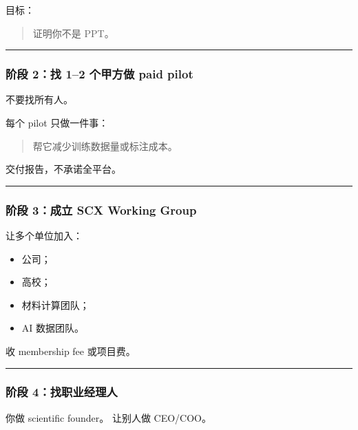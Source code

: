 \documentclass[
  12pt,
]{ctexart}
\providecommand{\tightlist}{%
  \setlength{\itemsep}{0pt}\setlength{\parskip}{0pt}}
\begin{document}
目标：

\begin{quote}
证明你不是 PPT。
\end{quote}

\begin{center}\rule{0.5\linewidth}{0.5pt}\end{center}

\subsubsection{阶段 2：找 1--2 个甲方做 paid
pilot}\label{ux9636ux6bb5-2ux627e-12-ux4e2aux7532ux65b9ux505a-paid-pilot}

不要找所有人。

每个 pilot 只做一件事：

\begin{quote}
帮它减少训练数据量或标注成本。
\end{quote}

交付报告，不承诺全平台。

\begin{center}\rule{0.5\linewidth}{0.5pt}\end{center}

\subsubsection{阶段 3：成立 SCX Working
Group}\label{ux9636ux6bb5-3ux6210ux7acb-scx-working-group}

让多个单位加入：

\begin{itemize}
\tightlist
\item
  公司；
\item
  高校；
\item
  材料计算团队；
\item
  AI 数据团队。
\end{itemize}

收 membership fee 或项目费。

\begin{center}\rule{0.5\linewidth}{0.5pt}\end{center}

\subsubsection{阶段
4：找职业经理人}\label{ux9636ux6bb5-4ux627eux804cux4e1aux7ecfux7406ux4eba}

你做 scientific founder。 让别人做 CEO/COO。
\end{document}
